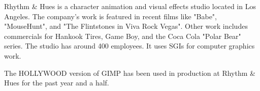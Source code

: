 Rhythm \& Hues is a character animation and visual effects studio located in
Los Angeles. The company's work is featured in recent films  like "Babe",
"MouseHunt", and "The Flintstones in Viva Rock Vegas". Other work includes
commercials for Hankook Tires, Game Boy, and the Coca Cola "Polar Bear" series.
The studio has around 400 employees. It uses SGIs for computer graphics work. 

The HOLLYWOOD version of GIMP  has been used in production at Rhythm \& Hues
for the past year and a half.
